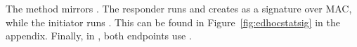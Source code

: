 The \mStatSig{} method mirrors \mSigStat{}.
%
The responder runs \mSig{} and creates \mAuthr{} as a signature over MAC, 
while the initiator runs \mStat{}.
%
This can be found in Figure~\ref{fig:edhocstatsig} in the appendix.
%
Finally, in \mStatStat{}, both endpoints use \mStat.
%
%
%
% 
%
%
%
